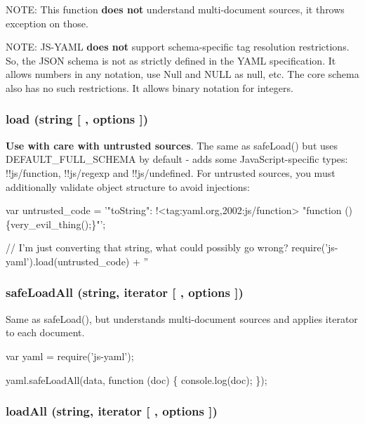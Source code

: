 N\+O\+TE\+: This function {\bfseries does not} understand multi-\/document sources, it throws exception on those.

N\+O\+TE\+: J\+S-\/\+Y\+A\+ML {\bfseries does not} support schema-\/specific tag resolution restrictions. So, the J\+S\+ON schema is not as strictly defined in the Y\+A\+ML specification. It allows numbers in any notation, use {\ttfamily Null} and {\ttfamily N\+U\+LL} as {\ttfamily null}, etc. The core schema also has no such restrictions. It allows binary notation for integers.

\subsubsection*{load (string \mbox{[} , options \mbox{]})}

{\bfseries Use with care with untrusted sources}. The same as {\ttfamily safe\+Load()} but uses {\ttfamily D\+E\+F\+A\+U\+L\+T\+\_\+\+F\+U\+L\+L\+\_\+\+S\+C\+H\+E\+MA} by default -\/ adds some Java\+Script-\/specific types\+: {\ttfamily !!js/function}, {\ttfamily !!js/regexp} and {\ttfamily !!js/undefined}. For untrusted sources, you must additionally validate object structure to avoid injections\+:


\begin{DoxyCode}
var untrusted\_code = '"toString": !<tag:yaml.org,2002:js/function> "function ()\{very\_evil\_thing();\}"';

// I'm just converting that string, what could possibly go wrong?
require('js-yaml').load(untrusted\_code) + ''
\end{DoxyCode}


\subsubsection*{safe\+Load\+All (string, iterator \mbox{[} , options \mbox{]})}

Same as {\ttfamily safe\+Load()}, but understands multi-\/document sources and applies {\ttfamily iterator} to each document.


\begin{DoxyCode}
var yaml = require('js-yaml');

yaml.safeLoadAll(data, function (doc) \{
  console.log(doc);
\});
\end{DoxyCode}


\subsubsection*{load\+All (string, iterator \mbox{[} , options \mbox{]})}

